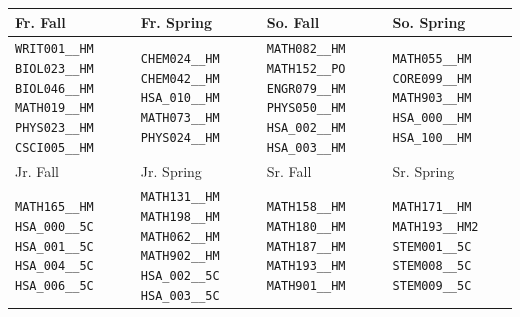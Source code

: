 \begin{tabular}{|p{}|p{}|p{}|p{}|}
    \hline
    Fr. Fall & Fr. Spring & So. Fall & So. Spring\\\hline
    \verb|WRIT001__HM| \verb|BIOL023__HM| \verb|BIOL046__HM| \verb|MATH019__HM| \verb|PHYS023__HM| \verb|CSCI005__HM|&
    \verb|CHEM024__HM| \verb|CHEM042__HM| \verb|HSA_010__HM| \verb|MATH073__HM| \verb|PHYS024__HM|&
    \verb|MATH082__HM| \verb|MATH152__PO| \verb|ENGR079__HM| \verb|PHYS050__HM| \verb|HSA_002__HM| \verb|HSA_003__HM|&
    \verb|MATH055__HM| \verb|CORE099__HM| \verb|MATH903__HM| \verb|HSA_000__HM| \verb|HSA_100__HM|\\
    \hline
    Jr. Fall & Jr. Spring & Sr. Fall & Sr. Spring\\\hline
    \verb|MATH165__HM| \verb|HSA_000__5C| \verb|HSA_001__5C| \verb|HSA_004__5C| \verb|HSA_006__5C|&
    \verb|MATH131__HM| \verb|MATH198__HM| \verb|MATH062__HM| \verb|MATH902__HM| \verb|HSA_002__5C| \verb|HSA_003__5C|&
    \verb|MATH158__HM| \verb|MATH180__HM| \verb|MATH187__HM| \verb|MATH193__HM| \verb|MATH901__HM|&
    \verb|MATH171__HM| \verb|MATH193__HM2| \verb|STEM001__5C| \verb|STEM008__5C| \verb|STEM009__5C|\\
    \hline
\end{tabular}